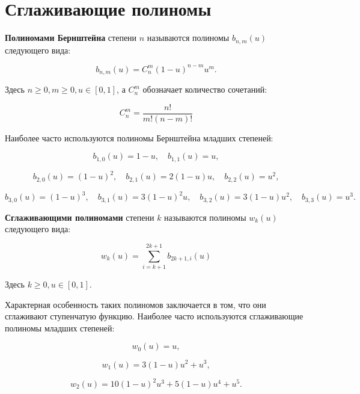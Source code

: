 \section{Сглаживающие полиномы}

\begin{definition}
\textbf{Полиномами Бернштейна} степени $n$ называются полиномы $b_{n,m}(u)$ следующего вида:

$$
b_{n,m}(u)=C_n^m(1-u)^{n-m}u^m.
$$
\end{definition}

Здесь $n \ge 0, m \ge 0, u \in [0,1]$, а $C_n^m$ обозначает количество сочетаний:

$$
C_n^m=\frac{n!}{m!(n-m)!}
$$

Наиболее часто используются полиномы Бернштейна младших степеней:

$$
b_{1,0}(u)=1-u, \quad b_{1,1}(u)=u,
$$

$$
b_{2,0}(u)=(1-u)^2, \quad b_{2,1}(u)=2(1-u)u, \quad b_{2,2}(u)=u^2,
$$

$$
b_{3,0}(u)=(1-u)^3, \quad b_{3,1}(u)=3(1-u)^2u, \quad b_{3,2}(u)=3(1-u)u^2, \quad b_{3,3}(u)=u^3.
$$

\begin{definition}
\textbf{Сглаживающими полиномами} степени $k$ называются полиномы $w_k(u)$ следующего вида:

$$
w_k(u)=\sum_{i=k+1}^{2k+1}b_{2k+1,i}(u)
$$
\end{definition}

Здесь $k \ge 0, u \in [0,1]$.

Характерная особенность таких полиномов заключается в том, что они сглаживают ступенчатую функцию. Наиболее часто
используются сглаживающие полиномы младших степеней:

$$
w_0(u)=u,
$$

$$
w_1(u)=3(1-u)u^2+u^3,
$$

$$
w_2(u)=10(1-u)^2u^3+5(1-u)u^4+u^5.
$$

